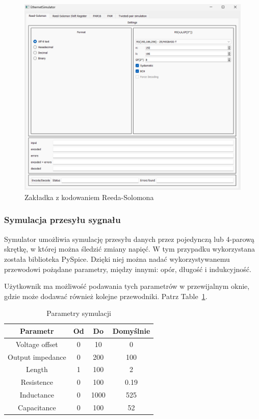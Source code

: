 \begin{figure}[ht]
    \centering
    \includegraphics[width=\textwidth]{images/rs.png}
    \caption{Zakładka z kodowaniem Reeda-Solomona}
    \label{fig:rs_image}
\end{figure}

\subsubsection{Symulacja przesyłu sygnału}
Symulator umożliwia symulację przesyłu danych przez pojedynczą lub 4-parową skrętkę, w której można śledzić zmiany napięć. W tym przypadku wykorzystana została biblioteka PySpice. Dzięki niej można nadać wykorzystywanemu przewodowi pożądane parametry, między innymi: opór, długość i indukcyjność.

Użytkownik ma możliwość podawania tych parametrów w przewijalnym oknie, gdzie może dodawać również kolejne przewodniki. Patrz Table~\ref{tab:parametry}.

\begin{table}[ht]
    \centering
    \begin{tabular}{|c|c|c|c|}
        \hline
        \textbf{Parametr} & \textbf{Od} & \textbf{Do} & \textbf{Domyślnie} \\
        \hline
        Voltage offset & 0 & 10 & 0 \\
        Output impedance & 0 & 200 & 100 \\
        Length & 1 & 100 & 2 \\
        Resistence & 0 & 100 & 0.19 \\
        Inductance & 0 & 1000 & 525 \\
        Capacitance & 0 & 100 & 52 \\
        \hline
    \end{tabular}
    \caption{Parametry symulacji}
    \label{tab:parametry}
\end{table}

